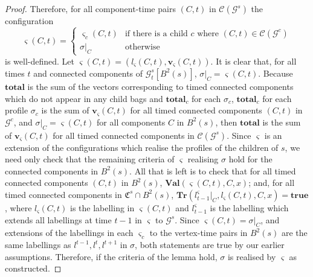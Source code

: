 \documentclass[a4paper,UKenglish,cleveref, autoref, thm-restate]{lipics-v2021} %
\begin{document}
\begin{toappendix}
\begin{proof}
    Therefore, for all component-time pairs $(C,t)$ in $\mathcal{C}(\mathcal{G}^s)$ the configuration 
    \[\varsigma(C,t) =
    \begin{cases} 
      \varsigma_c(C,t) & \text{if there is a child }c\text{ where } (C,t)\in\mathcal{C}(\mathcal{G}^c) \\
      \sigma|_C & \text{otherwise}
   \end{cases}\]
    is well-defined. Let $\varsigma(C,t) = (l_{\varsigma}(C,t),\textbf{v}_{\varsigma}(C,t))$. It is clear that, for all times $t$ and connected components of $\mathcal{G}^s_t[B^2(s)]$, $\sigma|_C=\varsigma(C,t)$. Because $\textbf{total}$ is the sum of the vectors corresponding to timed connected components which do not appear in any child bags and $\textbf{total}_c$ for each $\sigma_c$, $\textbf{total}_c$ for each profile $\sigma_c$ is the sum of $\textbf{v}_{\varsigma}(C,t)$ for all timed connected components $(C,t)$ in $\mathcal{G}^c$, and $\sigma|_C=\varsigma(C,t)$ for all components $C$ in $B^2(s)$, then $\textbf{total}$ is the sum of $\textbf{v}_{\varsigma}(C,t)$ for all timed connected components in $\mathcal{C}(\mathcal{G}^s)$.
    Since $\varsigma$ is an extension of the configurations which realise the profiles of the children of $s$, we need only check that the remaining criteria of $\varsigma$ realising $\sigma$ hold for the connected components in $B^2(s)$. All that is left is to check that for all timed connected components $(C,t)$ in $B^2(s)$, $\textbf{Val}(\varsigma(C,t),C,x)$; and, for all timed connected components in $\mathfrak{C}^s\cap B^2(s)$, $\textbf{Tr}(l^{\varsigma}_{t-1}|_C,l_{\varsigma}(C,t),C,x)=\textbf{true}$, where $l_{\varsigma}(C,t)$ is the labelling in $\varsigma(C,t)$ and $l^{\varsigma}_{t-1}$ is the labelling which extends all labellings at time $t-1$ in $\varsigma$ to $\mathcal{G}^s$. Since $\varsigma(C,t)=\sigma|_C$, and extensions of the labellings in each $\varsigma_c$ to the vertex-time pairs in $B^2(s)$ are the same labellings as $l^{t-1},l^t,l^{t+1}$ in $\sigma$, both statements are true by our earlier assumptions. Therefore, if the criteria of the lemma hold, $\sigma$ is realised by $\varsigma$ as constructed.


\end{proof}
\end{toappendix}
\end{document}

